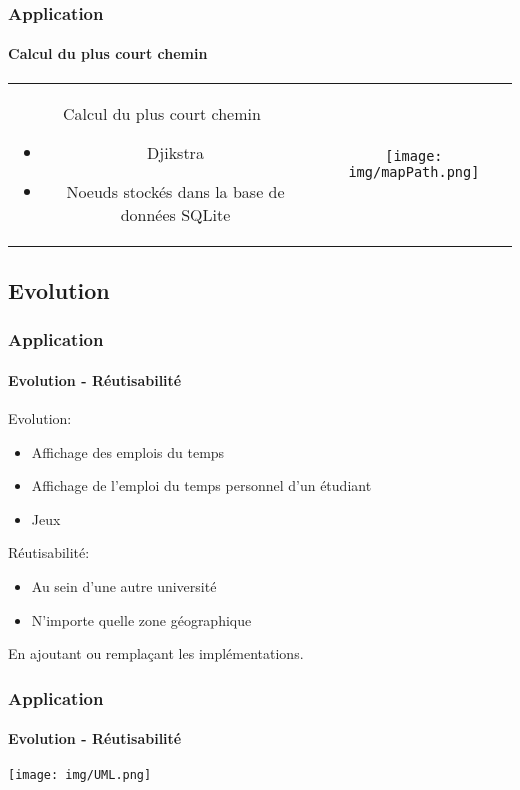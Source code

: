 \begin{frame}
\frametitle{Application}
\framesubtitle{Calcul du plus court chemin}

\begin{center}
\begin{tabular}{cc}
	\begin{minipage}{6cm}
		Calcul du plus court chemin
		\begin{itemize}
			\item Djikstra
			\item Noeuds stockés dans la base de données SQLite
		\end{itemize}
	\end{minipage}  &		
	\begin{minipage}{6cm}
		\texttt{[image: img/mapPath.png]} 
	\end{minipage}\\
\end{tabular}
\end{center}
\end{frame}

\subsection{Evolution}

\begin{frame}
\frametitle{Application}
\framesubtitle{Evolution - Réutisabilité}

Evolution:
\begin{itemize}
	\item Affichage des emplois du temps
	\item Affichage de l'emploi du temps personnel d'un étudiant 
	\item Jeux
\end{itemize}

Réutisabilité:
\begin{itemize}
	\item Au sein d'une autre université
	\item N'importe quelle zone géographique
\end{itemize}
En ajoutant ou remplaçant les implémentations.
\end{frame}



\begin{frame}
\frametitle{Application}
\framesubtitle{Evolution - Réutisabilité}

\texttt{[image: img/UML.png]} 
\end{frame}








